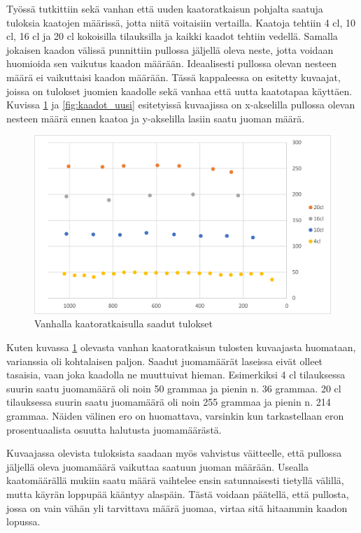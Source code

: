 Työssä tutkittiin sekä vanhan että uuden kaatoratkaisun pohjalta saatuja tuloksia kaatojen määrissä, jotta niitä voitaisiin vertailla. Kaatoja tehtiin 4 cl, 10 cl, 16 cl ja 20 cl kokoisilla tilauksilla ja kaikki kaadot tehtiin vedellä. Samalla jokaisen kaadon välissä punnittiin pullossa jäljellä oleva neste, jotta voidaan huomioida sen vaikutus kaadon määrään. Ideaalisesti pullossa olevan nesteen määrä ei vaikuttaisi kaadon määrään. Tässä kappaleessa on esitetty kuvaajat, joissa on tulokset juomien kaadolle sekä vanhaa että uutta kaatotapaa käyttäen. Kuvissa \ref{fig:kaadot_vanha} ja \ref{fig:kaadot_uusi} esitetyissä kuvaajissa on x-akselilla pullossa olevan nesteen määrä ennen kaatoa ja y-akselilla lasiin saatu juoman määrä.

\begin{figure}[h]
\begin{center}
\includegraphics[scale=0.25]{img/kaadot_vanha.pdf}
\end{center}
\caption{Vanhalla kaatoratkaisulla saadut tulokset}
\label{fig:kaadot_vanha}
\end{figure}

Kuten kuvassa \ref{fig:kaadot_vanha} olevasta vanhan kaatoratkaisun tulosten kuvaajasta huomataan, varianssia oli kohtalaisen paljon. Saadut juomamäärät laseissa eivät olleet tasaisia, vaan joka kaadolla ne muuttuivat hieman. Esimerkiksi 4 cl tilauksessa suurin saatu juomamäärä oli noin 50 grammaa ja pienin n. 36 grammaa. 20 cl tilauksessa suurin saatu juomamäärä oli noin 255 grammaa ja pienin n. 214 grammaa. Näiden välinen ero on huomattava, varsinkin kun tarkastellaan eron prosentuaalista osuutta halutusta juomamäärästä.

Kuvaajassa olevista tuloksista saadaan myös vahvistus väitteelle, että pullossa jäljellä oleva juomamäärä vaikuttaa saatuun juoman määrään. Usealla kaatomäärällä mukiin saatu määrä vaihtelee ensin satunnaisesti tietyllä välillä, mutta käyrän loppupää kääntyy alaspäin. Tästä voidaan päätellä, että pullosta, jossa on vain vähän yli tarvittava määrä juomaa, virtaa sitä hitaammin kaadon lopussa.

